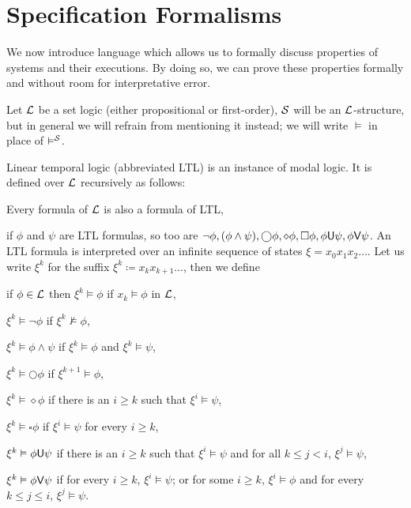 \vfill\break

\section{Specification Formalisms}

We now introduce language which allows us to formally discuss properties of systems and their executions.
By doing so, we can prove these properties formally and without room for interpretative error.

Let ${\cal L}$ be a set logic (either propositional or first-order),
${\cal S}$ will be an ${\cal L}$-structure, but in general we will refrain from mentioning it instead; we will write $\vDash$ in place of $\vDash^{\cal S}$.

\bdefn

    {\emphcolor Linear temporal logic} (abbreviated LTL) is an instance of modal logic.
    It is defined over ${\cal L}$ recursively as follows:
    \benum
        \item Every formula of ${\cal L}$ is also a formula of LTL,
        \item if $\phi$ and $\psi$ are LTL formulas, so too are $\neg\phi,(\phi\land\psi),\bigcirc\phi,\diamond\phi,\square\phi,\phi{\sf U}\psi,\phi{\sf V}\psi$.
    \eenum
    An LTL formula is interpreted over an infinite sequence of states $\xi=x_0x_1x_2\dots$.
    Let us write $\xi^k$ for the suffix $\xi^k\coloneqq x_kx_{k+1}\dots$, then we define
    \benum
        \item if $\phi\in{\cal L}$ then $\xi^k\vDash\phi$ if $x_k\vDash\phi$ in ${\cal L}$,
        \item $\xi^k\vDash\neg\phi$ if $\xi^k\nvDash\phi$,
        \item $\xi^k\vDash\phi\land\psi$ if $\xi^k\vDash\phi$ and $\xi^k\vDash\psi$,
        \item $\xi^k\vDash\bigcirc\phi$ if $\xi^{k+1}\vDash\phi$,
        \item $\xi^k\vDash\diamond\phi$ if there is an $i\geq k$ such that $\xi^i\vDash\psi$,
        \item $\xi^k\vDash\square\phi$ if $\xi^i\vDash\psi$ for every $i\geq k$,
        \item $\xi^k\vDash\phi{\sf U}\psi$ if there is an $i\geq k$ such that $\xi^i\vDash\psi$ and for all $k\leq j<i$, $\xi^j\vDash\psi$,
        \item $\xi^k\vDash\phi{\sf V}\psi$ if for every $i\geq k$, $\xi^i\vDash\psi$; or for some $i\geq k$, $\xi^i\vDash\phi$ and for every $k\leq j\leq i$, $\xi^j\vDash\psi$.
    \eenum

